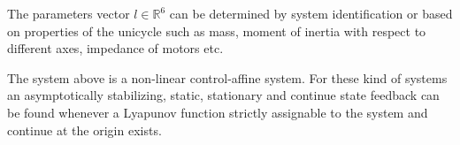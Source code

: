 \documentclass[letterpaper, 10 pt, conference]{ieeeconf}  %
\begin{document}
%

%

The parameters vector ${l \in \mathds{R}^6}$ can be determined by system identification or based on properties of the unicycle such as mass, moment of inertia with respect to different axes, impedance of motors etc.

The system above is a non-linear control-affine system. For these kind of systems an asymptotically stabilizing, static, stationary and continue state feedback can be found whenever a Lyapunov function strictly assignable to the system and continue at the origin exists.
\end{document}
